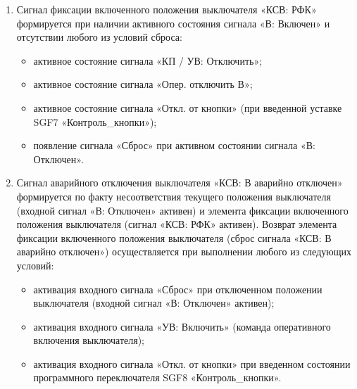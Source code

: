 \begin{enumerate}
\item
Сигнал фиксации включенного положения выключателя «КСВ: РФК» формируется при наличии активного состояния сигнала «В: Включен» и отсутствии любого из условий сброса:
\begin{itemize}
    \item активное состояние сигнала «КП / УВ: Отключить»;
    \item активное состояние сигнала «Опер. отключить В»;
    \item активное состояние сигнала «Откл. от кнопки» (при введенной уставке SGF7 «Контроль\_кнопки»); 
    \item появление сигнала «Сброс» при активном состоянии сигнала «В: Отключен».
\end{itemize}

\item
Сигнал аварийного отключения выключателя «КСВ: В аварийно отключен» формируется по факту несоответствия текущего положения выключателя (входной сигнал «В: Отключен» активен) и элемента фиксации включенного положения выключателя (сигнал «КСВ: РФК» активен). Возврат элемента фиксации включенного положения выключателя (сброс сигнала «КСВ: В аварийно отключен») осуществляется при выполнении любого из следующих условий:
\begin{itemize}
\item активация входного сигнала «Сброс» при отключенном положении выключателя (входной сигнал «В: Отключен» активен);
\item активация входного сигнала «УВ: Включить» (команда оперативного включения выключателя);
\item активация входного сигнала «Откл. от кнопки» при введенном состоянии программного переключателя SGF8 «Контроль\_кнопки».
\end{itemize}


\end{enumerate}
